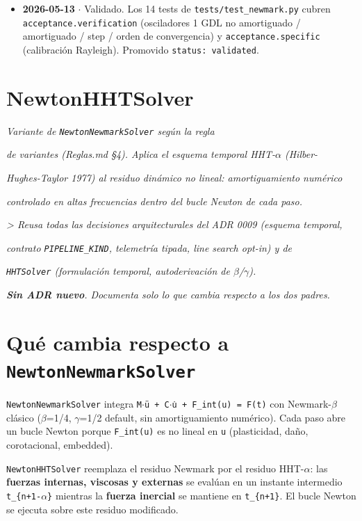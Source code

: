 \documentclass[11pt,letterpaper,oneside]{report}
\begin{document}
\begin{itemize}
  \item \textbf{2026-05-13} \ensuremath{\cdot} Validado. Los 14 tests de \texttt{tests/test\_newmark.py} cubren \texttt{acceptance.verification} (osciladores 1 GDL no amortiguado / amortiguado / step / orden de convergencia) y \texttt{acceptance.specific} (calibración Rayleigh). Promovido \texttt{status: validated}.
\end{itemize}


\newpage

\section{NewtonHHTSolver}



\textit{Variante de \texttt{NewtonNewmarkSolver} según la regla}

\textit{de variantes (Reglas.md §4). Aplica el esquema temporal HHT-\ensuremath{\alpha} (Hilber-}

\textit{Hughes-Taylor 1977) al residuo dinámico no lineal: amortiguamiento numérico}

\textit{controlado en altas frecuencias dentro del bucle Newton de cada paso.}

\textit{> Reusa todas las decisiones arquitecturales del ADR 0009 (esquema temporal,}

\textit{contrato \texttt{PIPELINE\_KIND}, telemetría tipada, line search opt-in) y de}

\textit{\texttt{HHTSolver} (formulación temporal, autoderivación de \ensuremath{\beta}/\ensuremath{\gamma}).}

\textit{\textbf{Sin ADR nuevo}. Documenta solo lo que cambia respecto a los dos padres.}



\section{Qué cambia respecto a \texttt{NewtonNewmarkSolver}}

\texttt{NewtonNewmarkSolver} integra \texttt{M\ensuremath{\cdot}ü + C\ensuremath{\cdot}u̇ + F\_int(u) = F(t)} con Newmark-\ensuremath{\beta}
clásico (\ensuremath{\beta}=1/4, \ensuremath{\gamma}=1/2 default, sin amortiguamiento numérico). Cada paso
abre un bucle Newton porque \texttt{F\_int(u)} es no lineal en \texttt{u} (plasticidad,
daño, corotacional, embedded).

\texttt{NewtonHHTSolver} reemplaza el residuo Newmark por el residuo HHT-\ensuremath{\alpha}: las
\textbf{fuerzas internas, viscosas y externas} se evalúan en un instante
intermedio \texttt{t\_\{n+1-\ensuremath{\alpha}\}} mientras la \textbf{fuerza inercial} se mantiene en
\texttt{t\_\{n+1\}}. El bucle Newton se ejecuta sobre este residuo modificado.
\end{document}

